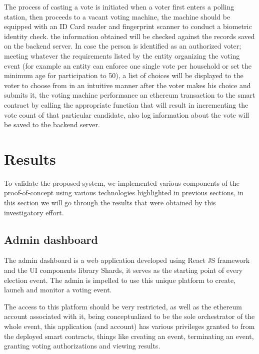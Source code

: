 The process of casting a vote is initiated when a voter first enters a polling station, then proceeds to a vacant voting machine, the machine should be equipped with an ID Card reader and fingerprint scanner to conduct a biometric identity check. the information obtained will be checked against the records saved on the backend server. In case the person is identified as an authorized voter; meeting whatever the requirements listed by the entity organizing the voting event (for example an entity can enforce one single vote per household or set the minimum age for participation to 50), a list of choices will be displayed to the voter to choose from in an intuitive manner after the voter makes his choice and submits it, the voting machine performance an ethereum transaction to the smart contract by calling the appropriate function that will result in incrementing the vote count of that particular candidate, also log information about the vote will be saved to the backend server.

\section{Results}

To validate the proposed system, we implemented various components of the proof-of-concept using various technologies highlighted in previous sections, in this section we will go through the results that were obtained by this investigatory effort.

\subsection{Admin dashboard}

The admin dashboard is a web application developed using React JS framework and the UI components library Shards\cite{ShardsReact}, it serves as the starting point of every election event. The admin is impelled to use this unique platform to create, launch and monitor a voting event.

The access to this platform should be very restricted, as well as the ethereum account associated with it, being conceptualized to be the sole orchestrator of the whole event, this application (and account) has various privileges granted to from the deployed smart contracts, things like creating an event, terminating an event, granting voting authorizations and viewing results.

